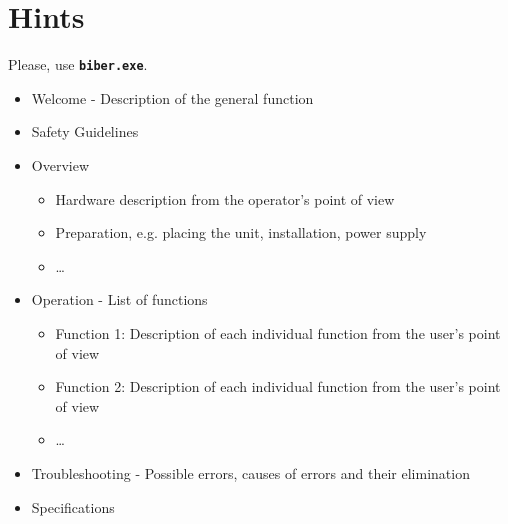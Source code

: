%
%
%



\chapter{Hints}

Please, use  \textbf{\texttt{biber.exe}}.

\bigskip



\begin{itemize}
	\item Welcome - Description of the general function
	\item Safety Guidelines
	\item Overview
	\begin{itemize}
		\item Hardware description from the operator's point of view
		\item Preparation, e.g. placing the unit, installation, power supply
		\item \ldots
	\end{itemize}
	\item Operation - List of functions
	\begin{itemize}
		\item Function 1: Description of each individual function from the user's point of view
		\item Function 2: Description of each individual function from the user's point of view
		\item \ldots
	\end{itemize}
	\item Troubleshooting - Possible errors, causes of errors and their elimination
	\item Specifications 
\end{itemize}


